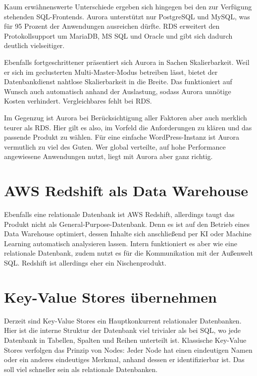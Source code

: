 Kaum erwähnenswerte Unterschiede ergeben sich hingegen bei den zur Verfügung stehenden SQL-Frontends. Aurora unterstützt nur PostgreSQL und MySQL, was für 95 Prozent der Anwendungen ausreichen dürfte. RDS erweitert den Protokollsupport um MariaDB, MS SQL und Oracle und gibt sich dadurch deutlich vielseitiger.

Ebenfalls fortgeschrittener präsentiert sich Aurora in Sachen Skalierbarkeit. Weil er sich im geclusterten Multi-Master-Modus betreiben lässt, bietet der Datenbankdienst nahtlose Skalierbarkeit in die Breite. Das funktioniert auf Wunsch auch automatisch anhand der Auslastung, sodass Aurora unnötige Kosten verhindert. Vergleichbares fehlt bei RDS.

Im Gegenzug ist Aurora bei Berücksichtigung aller Faktoren aber auch merklich teurer als RDS. Hier gilt es also, im Vorfeld die Anforderungen zu klären und das passende Produkt zu wählen. Für eine einfache WordPress-Instanz ist Aurora vermutlich zu viel des Guten. Wer global verteilte, auf hohe Performance angewiesene Anwendungen nutzt, liegt mit Aurora aber ganz richtig.

\section{AWS Redshift als Data Warehouse}

Ebenfalls eine relationale Datenbank ist AWS Redshift, allerdings taugt das Produkt nicht als General-Purpose-Datenbank. Denn es ist auf den Betrieb eines Data Warehouse optimiert, dessen Inhalte sich anschließend per KI oder Machine Learning automatisch analysieren lassen. Intern funktioniert es aber wie eine relationale Datenbank, zudem nutzt es für die Kommunikation mit der Außenwelt SQL. Redshift ist allerdings eher ein Nischenprodukt.

\section{Key-Value Stores übernehmen}

Derzeit sind Key-Value Stores ein Hauptkonkurrent relationaler Datenbanken. Hier ist die interne Struktur der Datenbank viel trivialer als bei SQL, wo jede Datenbank in Tabellen, Spalten und Reihen unterteilt ist. Klassische Key-Value Stores verfolgen das Prinzip von Nodes: Jeder Node hat einen eindeutigen Namen oder ein anderes eindeutiges Merkmal, anhand dessen er identifizierbar ist. Das soll viel schneller sein als relationale Datenbanken.

